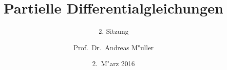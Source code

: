 \documentclass[handout]{beamer}
\title[]{Partielle Differentialgleichungen}
\subtitle{2. Sitzung}
\date[2.~M"arz 2016]{2.~M"arz 2016}
\author{Prof.~Dr.~Andreas M"uller}
\begin{document}
\begin{frame}
\titlepage

\end{frame}


\end{document}
